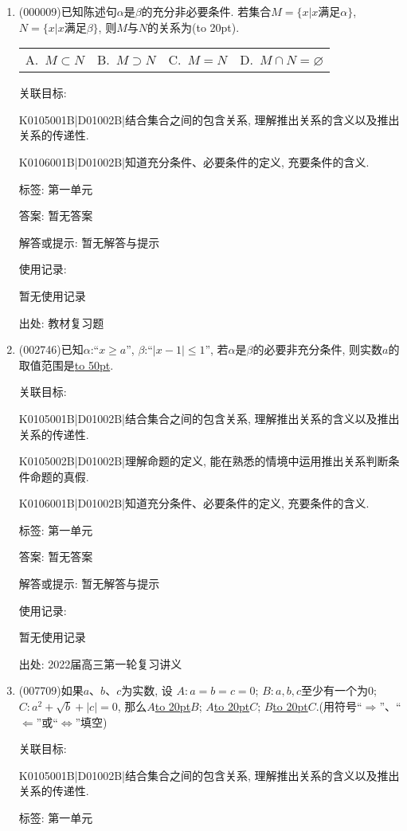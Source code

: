 \documentclass[10pt,a4paper]{article}
\newcommand{\blank}[1]{\underline{\hbox to #1pt{}}}
\newcommand{\bracket}[1]{(\hbox to #1pt{})}
\newcommand{\fourch}[4]{\par\begin{tabular}{p{.23\textwidth}p{.23\textwidth}p{.23\textwidth}p{.23\textwidth}}
A.~#1 &B.~#2& C.~#3& D.~#4
\end{tabular}}
\begin{document}
\begin{enumerate}[1.]

\item { (000009)}已知陈述句$\alpha$是$\beta$的充分非必要条件. 若集合$M=\{x|x\text{满足}\alpha\}$, $N=\{x|x\text{满足}\beta\}$, 则$M$与$N$的关系为\bracket{20}.
\fourch{$M\subset N$}{$M\supset N$}{$M=N$}{$M\cap N=\varnothing$}


关联目标:

K0105001B|D01002B|结合集合之间的包含关系, 理解推出关系的含义以及推出关系的传递性.

K0106001B|D01002B|知道充分条件、必要条件的定义, 充要条件的含义.



标签: 第一单元

答案: 暂无答案

解答或提示: 暂无解答与提示

使用记录:

暂无使用记录


出处: 教材复习题
\item { (002746)}已知$\alpha$:``$x\ge a$'', $\beta$:``$|x-1|\le 1$'', 若$\alpha$是$\beta$的必要非充分条件, 则实数$a$的取值范围是\blank{50}.


关联目标:

K0105001B|D01002B|结合集合之间的包含关系, 理解推出关系的含义以及推出关系的传递性.

K0105002B|D01002B|理解命题的定义, 能在熟悉的情境中运用推出关系判断条件命题的真假.

K0106001B|D01002B|知道充分条件、必要条件的定义, 充要条件的含义.



标签: 第一单元

答案: 暂无答案

解答或提示: 暂无解答与提示

使用记录:

暂无使用记录


出处: 2022届高三第一轮复习讲义
\item { (007709)}如果$a$、$b$、$c$为实数, 设
$A:a=b=c=0$; $B:a,b,c$至少有一个为$0$; $C:a^2+\sqrt b+|c|=0$, 那么$A$\blank{20}$B$; $A$\blank{20}$C$; $B$\blank{20}$C$.(用符号``$\Rightarrow$''、``$\Leftarrow$''或``$\Leftrightarrow$''填空)


关联目标:

K0105001B|D01002B|结合集合之间的包含关系, 理解推出关系的含义以及推出关系的传递性.



标签: 第一单元


\end{enumerate}
\end{document}
